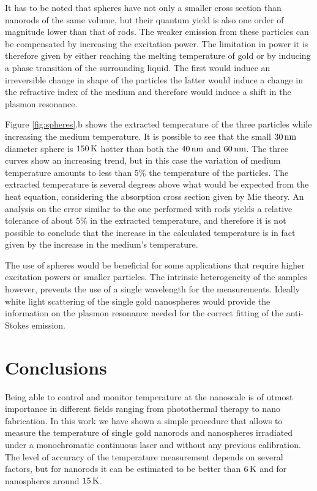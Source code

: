 It has to be noted that spheres have not only a smaller cross section than
nanorods of the same volume, but their quantum yield is also one order of
magnitude lower than that of rods\cite{Yorulmaz2012}. The weaker emission from
these particles can be compensated by increasing the excitation power. The
limitation in power it is therefore given by either reaching the melting
temperature of gold or by inducing a phase transition of the surrounding liquid.
The first would induce an irreversible change in shape of the
particles\cite{Zijlstra2009a} the latter would induce a change in the refractive
index of the medium and therefore would induce a shift in the plasmon
resonance\cite{Hou2015}.

Figure \ref{fig:spheres}.b shows the extracted temperature of the three
particles while increasing the medium temperature. It is possible to see that
the small $30\,\textrm{nm}$ diameter sphere is $150\,\textrm{K}$ hotter than both the $40\,\textrm{nm}$ and
$60\,\textrm{nm}$. The three curves show an increasing trend, but in this case the
variation of medium temperature amounts to less than $5\%$ the temperature of
the particles. The extracted temperature is several degrees above what would be
expected from the heat equation, considering the absorption cross section given
by Mie theory. An analysis on the error similar to the one performed with rods
yields a relative tolerance of about $5\%$ in the extracted temperature, and
therefore it is not possible to conclude that the increase in the calculated
temperature is in fact given by the increase in the medium's temperature.

The use of spheres would be beneficial for some applications that require higher
excitation powers or smaller particles. The intrinsic heterogeneity of the
samples however, prevents the use of a single wavelength for the
measurements. Ideally white light scattering of the single gold nanospheres
would provide the information on the plasmon resonance needed for the
correct fitting of the anti-Stokes emission.

\section{Conclusions}
Being able to control and monitor temperature at the nanoscale is of utmost
importance in different fields ranging from photothermal therapy\cite{Huang2006}
to nano fabrication\cite{Fedoruk2013}. In this work we have shown a simple
procedure that allows to measure the temperature of single gold nanorods and
nanospheres irradiated under a monochromatic continuous laser and without any
previous calibration. The level of accuracy of the temperature measurement
depends on several factors, but for nanorods it can be estimated to be better
than $6\,\textrm{K}$ and for nanospheres around $15\,\textrm{K}$.

